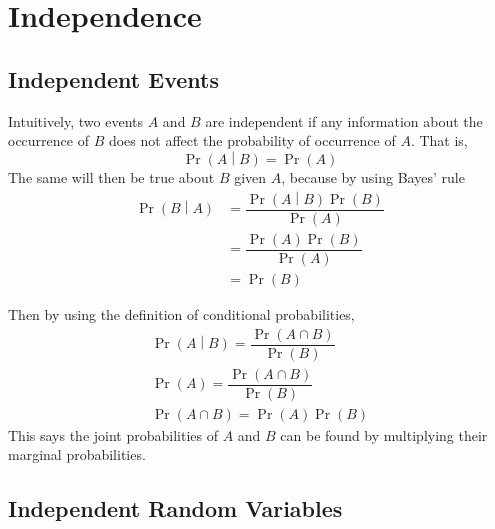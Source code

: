 \documentclass[11pt]{report} %
\begin{document}
\section{Independence}

\subsection{Independent Events}

Intuitively, two events $A$ and $B$ are independent if any information about the occurrence of $B$  does not affect the probability of occurrence of $A$. That is, 
\begin{equation}
\operatorname{Pr}\left(A\middle|B\right) = \operatorname{Pr}\left(A\right)
\end{equation}
The same will then be true about $B$ given $A$, because by using Bayes' rule
\begin{align}
\operatorname{Pr}\left(B\middle|A\right) &= \dfrac{\operatorname{Pr}\left(A\middle|B\right)\operatorname{Pr}\left(B\right)}{\operatorname{Pr}\left(A\right)} \\
&= \dfrac{\operatorname{Pr}\left(A\right)\operatorname{Pr}\left(B\right)}{\operatorname{Pr}\left(A\right)} \\
&= \operatorname{Pr}\left(B\right)
\end{align}

Then by using the definition of conditional probabilities,
\begin{gather}
\operatorname{Pr}\left(A\middle|B\right) = \dfrac{\operatorname{Pr}\left(A\cap B\right)}{\operatorname{Pr}\left(B\right)} \\
\operatorname{Pr}\left(A\right) = \dfrac{\operatorname{Pr}\left(A\cap B\right)}{\operatorname{Pr}\left(B\right)} \\
\operatorname{Pr}\left(A\cap B\right) = \operatorname{Pr}\left(A\right)\operatorname{Pr}\left(B\right)
\end{gather}
This says the joint probabilities of $A$ and $B$ can be found by multiplying their marginal probabilities.

\subsection{Independent Random Variables}
\end{document}
